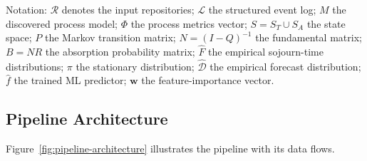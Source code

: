 Notation: $\mathcal{R}$ denotes the input repositories;
$\mathcal{L}$ the structured event log; $M$ the discovered process
model; $\Phi$ the process metrics vector; $S = S_T \cup S_A$ the state
space; $P$ the Markov transition matrix; $N = (I-Q)^{-1}$ the
fundamental matrix; $B = NR$ the absorption probability matrix;
$\hat{F}$ the empirical sojourn-time distributions; $\pi$ the
stationary distribution; $\hat{\mathcal{D}}$ the empirical forecast
distribution; $\hat{f}$ the trained ML predictor; $\mathbf{w}$ the
feature-importance vector.

\subsection{Pipeline Architecture}
\label{sec:arch-figure}

Figure~\ref{fig:pipeline-architecture} illustrates the pipeline with
its data flows.

